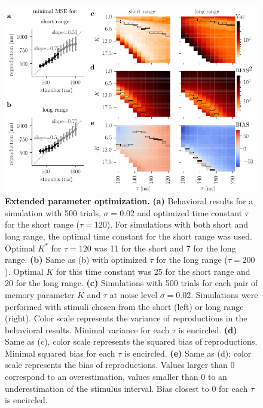 \documentclass[10pt, a4paper]{article}
\begin{document}
\begin{figure}[!htb]
	\centering
	\includegraphics{figures/supp_othererror.pdf}
	\caption{\textbf{Extended parameter optimization.}
	\textbf{(a)} Behavioral results for a simulation with 500 trials, $\sigma = 0.02$ and optimized time constant $\tau$ for the short range ($\tau = 120$). For simulations with both short and long range, the optimal time constant for the short range was used. Optimal $K^*$ for $\tau = 120$ was 11 for the short and 7 for the long range.
	\textbf{(b)} Same as (b) with optimized $\tau$ for the long range ($\tau = 200$). Optimal $K$ for this time constant was 25 for the short range and 20 for the long range. 
	\textbf{(c)}  Simulations with 500 trials for each pair of memory parameter $K$ and $\tau$ at noise level $\sigma = 0.02$. Simulations were performed with stimuli chosen from the short (left) or long range (right). Color scale represents the variance of reproductions in the behavioral results. Minimal variance for each $\tau$ is encircled.
	\textbf{(d)} Same as (c), color scale represents the squared bias of reproductions. Minimal squared bias for each $\tau$ is encircled.
	\textbf{(e)} Same as (d); color scale represents the bias of reproductions. Values larger than 0 correspond to an overestimation, values smaller than 0 to an underestimation of the stimulus interval. Bias closest to 0 for each $\tau$ is encircled.
	}
\label{sup:othererror}
\end{figure}
\end{document}
